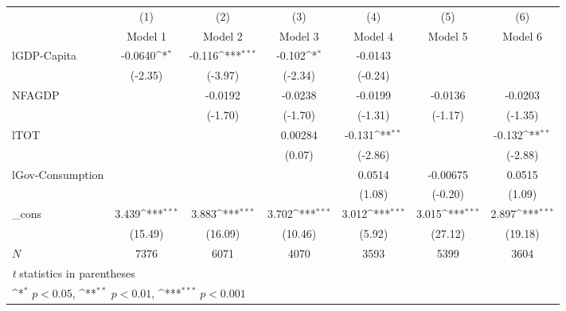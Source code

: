 \documentclass{article}
\begin{document}
{
\def\sym#1{\ifmmode^{#1}\else\(^{#1}\)\fi}
\begin{tabular}{l*{6}{c}}
\hline\hline
            &\multicolumn{1}{c}{(1)}&\multicolumn{1}{c}{(2)}&\multicolumn{1}{c}{(3)}&\multicolumn{1}{c}{(4)}&\multicolumn{1}{c}{(5)}&\multicolumn{1}{c}{(6)}\\
            &\multicolumn{1}{c}{Model 1}&\multicolumn{1}{c}{Model 2}&\multicolumn{1}{c}{Model 3}&\multicolumn{1}{c}{Model 4}&\multicolumn{1}{c}{Model 5}&\multicolumn{1}{c}{Model 6}\\
\hline
lGDP-Capita &     -0.0640\sym{*}  &      -0.116\sym{***}&      -0.102\sym{*}  &     -0.0143         &                     &                     \\
            &     (-2.35)         &     (-3.97)         &     (-2.34)         &     (-0.24)         &                     &                     \\
[1em]
NFAGDP      &                     &     -0.0192         &     -0.0238         &     -0.0199         &     -0.0136         &     -0.0203         \\
            &                     &     (-1.70)         &     (-1.70)         &     (-1.31)         &     (-1.17)         &     (-1.35)         \\
[1em]
lTOT        &                     &                     &     0.00284         &      -0.131\sym{**} &                     &      -0.132\sym{**} \\
            &                     &                     &      (0.07)         &     (-2.86)         &                     &     (-2.88)         \\
[1em]
lGov-Consumption&                     &                     &                     &      0.0514         &    -0.00675         &      0.0515         \\
            &                     &                     &                     &      (1.08)         &     (-0.20)         &      (1.09)         \\
[1em]
\_cons      &       3.439\sym{***}&       3.883\sym{***}&       3.702\sym{***}&       3.012\sym{***}&       3.015\sym{***}&       2.897\sym{***}\\
            &     (15.49)         &     (16.09)         &     (10.46)         &      (5.92)         &     (27.12)         &     (19.18)         \\
\hline
\(N\)       &        7376         &        6071         &        4070         &        3593         &        5399         &        3604         \\
\hline\hline
\multicolumn{7}{l}{\footnotesize \textit{t} statistics in parentheses}\\
\multicolumn{7}{l}{\footnotesize \sym{*} \(p<0.05\), \sym{**} \(p<0.01\), \sym{***} \(p<0.001\)}\\
\end{tabular}
}
\\
\end{document}
